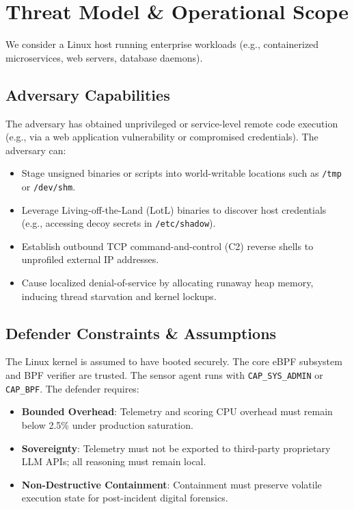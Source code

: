 \documentclass[conference]{IEEEtran}
\begin{document}
\section{Threat Model \& Operational Scope}
\label{sec:threat_model}
We consider a Linux host running enterprise workloads (e.g., containerized microservices, web servers, database daemons). 

\subsection{Adversary Capabilities}
The adversary has obtained unprivileged or service-level remote code execution (e.g., via a web application vulnerability or compromised credentials). The adversary can:
\begin{itemize}
    \item Stage unsigned binaries or scripts into world-writable locations such as \texttt{/tmp} or \texttt{/dev/shm}.
    \item Leverage Living-off-the-Land (LotL) binaries to discover host credentials (e.g., accessing decoy secrets in \texttt{/etc/shadow}).
    \item Establish outbound TCP command-and-control (C2) reverse shells to unprofiled external IP addresses.
    \item Cause localized denial-of-service by allocating runaway heap memory, inducing thread starvation and kernel lockups.
\end{itemize}

\subsection{Defender Constraints \& Assumptions}
The Linux kernel is assumed to have booted securely. The core eBPF subsystem and BPF verifier are trusted. The sensor agent runs with \texttt{CAP\_SYS\_ADMIN} or \texttt{CAP\_BPF}. The defender requires:
\begin{itemize}
    \item \textbf{Bounded Overhead}: Telemetry and scoring CPU overhead must remain below 2.5\% under production saturation.
    \item \textbf{Sovereignty}: Telemetry must not be exported to third-party proprietary LLM APIs; all reasoning must remain local.
    \item \textbf{Non-Destructive Containment}: Containment must preserve volatile execution state for post-incident digital forensics.
\end{itemize}
\end{document}
